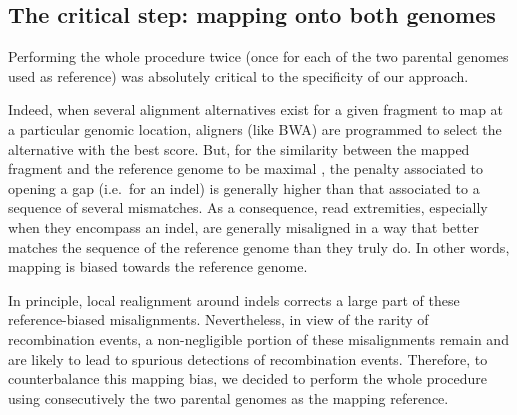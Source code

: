 \begin{mccorrection}
\end{mccorrection}



\subsection{The critical step: mapping onto both genomes}


Performing the whole procedure twice (once for each of the two parental genomes used as reference) was absolutely critical to the specificity of our approach.

Indeed, when several alignment alternatives exist for a given fragment to map at a particular genomic location, aligners (like BWA) are programmed to select the alternative with the best score.
But, for the similarity between the mapped fragment and the reference genome to be maximal \citep{smith1981identification}, the penalty associated to opening a gap (i.e.\ for an indel) is generally higher than that associated to a sequence of several mismatches.
As a consequence, read extremities, especially when they encompass an indel, are generally misaligned in a way that better matches the sequence of the reference genome than they truly do.
In other words, mapping is biased towards the reference genome.

In principle, local realignment around indels corrects a large part of these reference-biased misalignments.
Nevertheless, in view of the rarity of recombination events, a non-negligible portion of these misalignments remain and are likely to lead to spurious detections of recombination events.
Therefore, to counterbalance this mapping bias, we decided to perform the whole procedure using consecutively the two parental genomes as the mapping reference.\\

